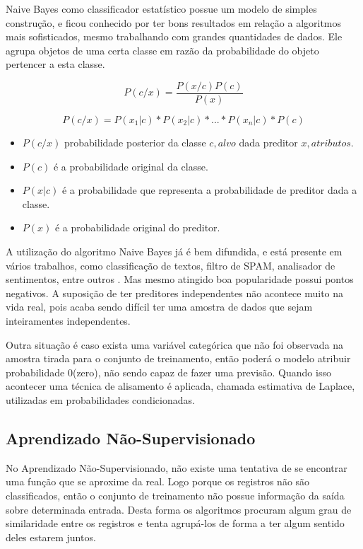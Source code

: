 Naive Bayes como classificador estatístico possue um modelo de simples construção, e ficou conhecido por ter bons resultados em relação a algoritmos mais sofisticados, mesmo trabalhando com grandes quantidades de dados. Ele agrupa objetos de uma certa classe em razão da probabilidade do objeto pertencer a esta classe. 

\begin{equation}
 P(c/x)= \frac{P(x/c)P(c)}{P(x)}
\end{equation}

\begin{equation}
 P(c/x)=P(x_1|c)*P(x_2|c)*...*P(x_n|c)*P(c)
 \label{eq:bayes}
\end{equation}


\begin{itemize}
 \item ${P(c/x)}$ probabilidade posterior da classe ${c,alvo}$ dada preditor ${x,atributos}$.
 \item ${P(c)}$  é a probabilidade original da classe.
 \item ${P(x|c)}$  é a probabilidade que representa a probabilidade de preditor dada a classe.
 \item ${P(x)}$  é a probabilidade original do preditor.
\end{itemize}

A utilização do algoritmo Naive Bayes já é bem difundida, e está presente em vários trabalhos, como classificação de textos, filtro de SPAM, analisador de sentimentos, entre outros \cite{ Madureira2017, Lucca2013, Wu2008, Mccallum1997}. Mas mesmo atingido boa popularidade possui pontos negativos. A suposição de ter preditores independentes não acontece muito na vida real, pois acaba sendo difícil ter uma amostra de dados que sejam inteiramentes independentes. 

Outra situação é caso exista uma variável categórica que não foi observada na amostra tirada para o conjunto de treinamento, então poderá o modelo atribuir probabilidade 0(zero), não sendo capaz de fazer uma previsão. Quando isso acontecer uma técnica de alisamento é aplicada, chamada estimativa de Laplace, utilizadas em probabilidades condicionadas.


\subsection{Aprendizado Não-Supervisionado}\label{ssec:aprendNSup}

No Aprendizado Não-Supervisionado, não existe uma tentativa de se encontrar uma função que se aproxime da real. Logo porque os registros não são classificados, então o conjunto de treinamento não possue informação da saída sobre determinada entrada. Desta forma os algoritmos procuram algum grau de similaridade entre os registros e tenta agrupá-los de forma a ter algum sentido deles estarem juntos. 

